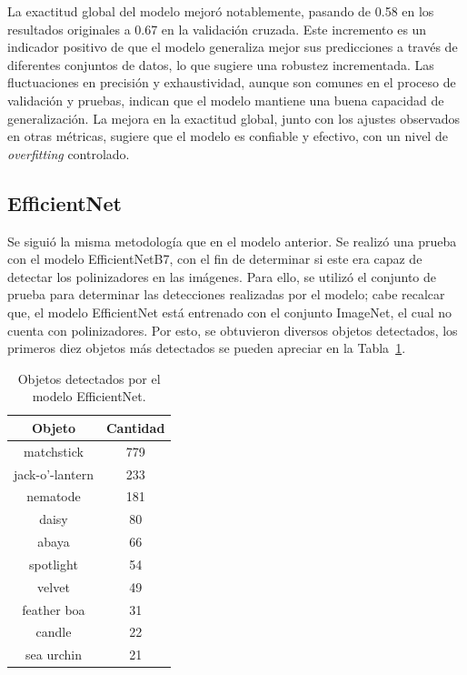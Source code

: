 La exactitud global del modelo mejoró notablemente, pasando de 0.58 en los resultados originales a 0.67 en la validación cruzada. Este incremento es un indicador positivo de que el modelo generaliza mejor sus predicciones a través de diferentes conjuntos de datos, lo que sugiere una robustez incrementada. Las fluctuaciones en precisión y exhaustividad, aunque son comunes en el proceso de validación y pruebas, indican que el modelo mantiene una buena capacidad de generalización. La mejora en la exactitud global, junto con los ajustes observados en otras métricas, sugiere que el modelo es confiable y efectivo, con un nivel de \textit{overfitting} controlado.

\subsection{EfficientNet}

Se siguió la misma metodología que en el modelo anterior. Se realizó una prueba con el modelo EfficientNetB7, con el fin de determinar si este era capaz de detectar los polinizadores en las imágenes. Para ello, se utilizó el conjunto de prueba para determinar las detecciones realizadas por el modelo; cabe recalcar que, el modelo EfficientNet \cite{tan-2019} está entrenado con el conjunto ImageNet, el cual no cuenta con polinizadores. Por esto, se obtuvieron diversos objetos detectados, los primeros diez objetos más detectados se pueden apreciar en la Tabla~\ref{tab:objetos_detectados_efficientnet}.

\begin{table}[H]
    \centering
    \begin{tabular}{cc}
        \toprule
        \textbf{Objeto} & \textbf{Cantidad} \\
        \midrule
        matchstick        &    779 \\
        jack-o'-lantern   &    233 \\
        nematode          &    181 \\
        daisy             &     80 \\
        abaya             &     66 \\
        spotlight         &     54 \\
        velvet            &     49 \\
        feather boa       &     31 \\
        candle            &     22 \\
        sea urchin        &     21 \\
        \bottomrule
    \end{tabular}
    \caption{Objetos detectados por el modelo EfficientNet.}
    \label{tab:objetos_detectados_efficientnet}
\end{table}

